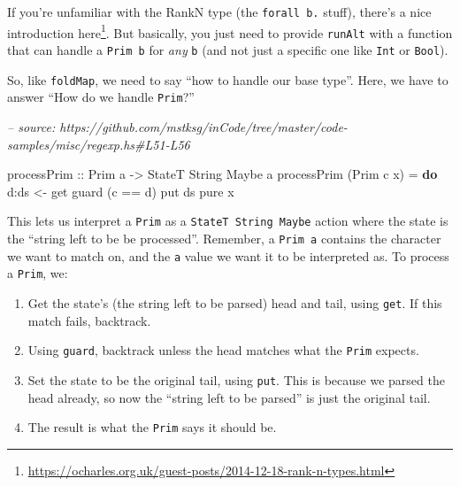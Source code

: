 \documentclass[]{article}
\newenvironment{Shaded}{}{}
\newcommand{\CommentTok}[1]{\textcolor[rgb]{0.38,0.63,0.69}{\textit{#1}}}
\newcommand{\DataTypeTok}[1]{\textcolor[rgb]{0.56,0.13,0.00}{#1}}
\newcommand{\FunctionTok}[1]{\textcolor[rgb]{0.02,0.16,0.49}{#1}}
\newcommand{\KeywordTok}[1]{\textcolor[rgb]{0.00,0.44,0.13}{\textbf{#1}}}
\newcommand{\NormalTok}[1]{#1}
\newcommand{\OtherTok}[1]{\textcolor[rgb]{0.00,0.44,0.13}{#1}}
\renewcommand{\href}[2]{#2\footnote{\url{#1}}}
\begin{document}
If you're unfamiliar with the RankN type (the \texttt{forall\ b.} stuff),
there's a
\href{https://ocharles.org.uk/guest-posts/2014-12-18-rank-n-types.html}{nice
introduction here}. But basically, you just need to provide \texttt{runAlt} with
a function that can handle a \texttt{Prim\ b} for \emph{any} \texttt{b} (and not
just a specific one like \texttt{Int} or \texttt{Bool}).

So, like \texttt{foldMap}, we need to say ``how to handle our base type''. Here,
we have to answer ``How do we handle \texttt{Prim}?''

\begin{Shaded}
\begin{Highlighting}[]
\CommentTok{-- source: https://github.com/mstksg/inCode/tree/master/code-samples/misc/regexp.hs#L51-L56}

\OtherTok{processPrim ::} \DataTypeTok{Prim}\NormalTok{ a }\OtherTok{->} \DataTypeTok{StateT} \DataTypeTok{String} \DataTypeTok{Maybe}\NormalTok{ a}
\NormalTok{processPrim (}\DataTypeTok{Prim}\NormalTok{ c x) }\FunctionTok{=} \KeywordTok{do}
\NormalTok{    d}\FunctionTok{:}\NormalTok{ds }\OtherTok{<-}\NormalTok{ get}
\NormalTok{    guard (c }\FunctionTok{==}\NormalTok{ d)}
\NormalTok{    put ds}
    \FunctionTok{pure}\NormalTok{ x}
\end{Highlighting}
\end{Shaded}

This lets us interpret a \texttt{Prim} as a \texttt{StateT\ String\ Maybe}
action where the state is the ``string left to be be processed''. Remember, a
\texttt{Prim\ a} contains the character we want to match on, and the \texttt{a}
value we want it to be interpreted as. To process a \texttt{Prim}, we:

\begin{enumerate}
\def\labelenumi{\arabic{enumi}.}
\tightlist
\item
  Get the state's (the string left to be parsed) head and tail, using
  \texttt{get}. If this match fails, backtrack.
\item
  Using \texttt{guard}, backtrack unless the head matches what the \texttt{Prim}
  expects.
\item
  Set the state to be the original tail, using \texttt{put}. This is because we
  parsed the head already, so now the ``string left to be parsed'' is just the
  original tail.
\item
  The result is what the \texttt{Prim} says it should be.
\end{enumerate}
\end{document}
